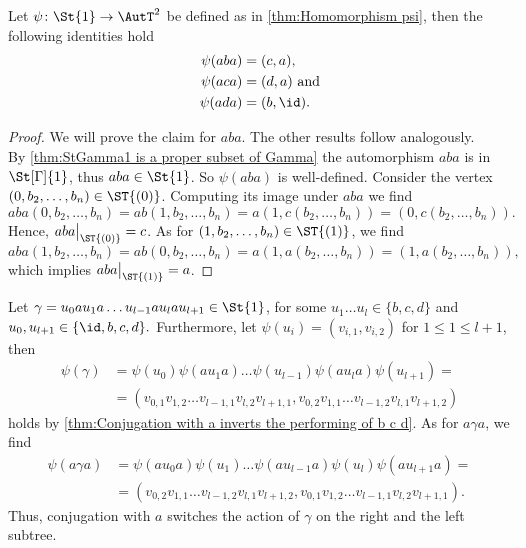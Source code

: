 \begin{thm}\label{thm:Conjugation with a inverts the performing of b c d}
Let $\psi\colon\St{1}\to\AutT^2$ be defined as in \cref{thm:Homomorphism psi}, then the following identities hold
\begin{align*}
\psi(aba)&=(c,a),\\
\psi(aca)&=(d,a) \text{ and}\\
\psi(ada)&=(b,\id).
\end{align*}
\end{thm}
\begin{proof}
We will prove the claim for $aba$. The other results follow analogously.\\
By \cref{thm:StGamma1 is a proper subset of Gamma} the automorphism $aba$ is in $\St[\Gamma]{1}$, thus $aba\in\St{1}$. So $\psi(aba)$ is well-defined. Consider the vertex $(0,b_2,\ldots,b_n)\in\ST{(0)}$. Computing its image under $aba$ we find
\begin{equation*}
aba(0,b_2,\ldots,b_n)=ab(1,b_2,\ldots,b_n)=a(1,c(b_2,\ldots,b_n))=(0,c(b_2,\ldots,b_n)).
\end{equation*}
Hence, $aba\big\vert_{\ST{(0)}}=c$. As for $(1,b_2,\ldots,b_n)\in\ST{(1)}$, we find
\begin{equation*}
aba(1,b_2,\ldots,b_n)=ab(0,b_2,\ldots,b_n)=a(1,a(b_2,\ldots,b_n))=(1,a(b_2,\ldots,b_n)),
\end{equation*}
which implies $aba\big\vert_{\ST{(1)}}=a$.
\end{proof}
\begin{rem}
Let $\gamma=u_0au_1a\ldots u_{l-1}au_lau_{l+1}\in\St{1}$, for some $u_1\ldots u_{l}\in\lbrace b,c,d\rbrace$ and $u_0,u_{l+1}\in\lbrace \id,b,c,d\rbrace.$ Furthermore, let $\psi(u_i)=(v_{i,1},v_{i,2})$ for $1\leq 1\leq l+1$, then 
\begin{align*}
\psi(\gamma)	&=\psi(u_0)\psi(au_1a)\ldots\psi(u_{l-1})\psi(au_la)\psi(u_{l+1})=\\
			&=(v_{0,1}v_{1,2}\ldots v_{l-1,1}v_{l,2}v_{l+1,1},v_{0,2}v_{1,1}\ldots v_{l-1,2}v_{l,1}v_{l+1,2})
\end{align*}
holds by \cref{thm:Conjugation with a inverts the performing of b c d}. As for $a\gamma a$, we find
\begin{align*}
\psi(a\gamma a)	&=\psi(au_0a)\psi(u_1)\ldots\psi(au_{l-1}a)\psi(u_l)\psi(au_{l+1}a)=\\
			&=(v_{0,2}v_{1,1}\ldots v_{l-1,2}v_{l,1}v_{l+1,2},v_{0,1}v_{1,2}\ldots v_{l-1,1}v_{l,2}v_{l+1,1}).
\end{align*}
Thus, conjugation with $a$ switches the action of $\gamma$ on the right and the left subtree.
\end{rem}
